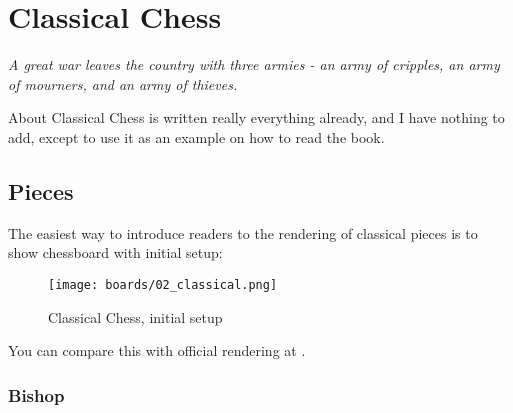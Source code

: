 

\chapter*{Classical Chess}
\label{ch:Classical Chess}

\begin{flushright}
\parbox{0.8\textwidth}{
\emph{A great war leaves the country with three armies -
an army of cripples, an army of mourners, and an army of thieves. \newline
{} } }
\end{flushright}

\noindent
About Classical Chess is written really everything already, and I have
nothing to add, except to use it as an example on how to read the book.

\clearpage %

\section*{Pieces}
\label{sec:Classical Chess/Pieces}

The easiest way to introduce readers to the rendering of classical pieces
is to show chessboard with initial setup:

\noindent
\begin{figure}[!h]
\texttt{[image: boards/02\_classical.png]}
\caption{Classical Chess, initial setup}
\label{fig:02_classical}
\end{figure}

\noindent
You can compare this with official rendering at .

\clearpage %

\subsection*{Bishop}
\label{sec:Classical Chess/Pieces/Bishop}

